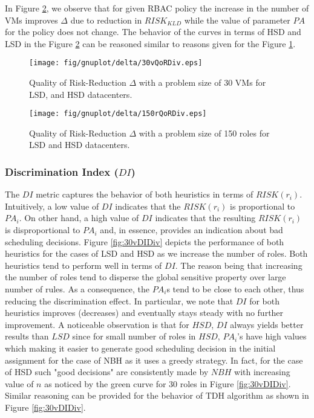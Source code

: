 In Figure \ref{fig:150rQoRDiv}, we observe that for given RBAC policy the increase in the number of VMs improves  $\Delta$ due to reduction in  $RISK_{KLD}$  while the value of parameter $PA$ for the policy does not change.   The behavior of the curves in terms of HSD and LSD in the Figure \ref{fig:150rQoRDiv} can be reasoned similar to reasons given for the Figure \ref{fig:30vQoRDiv}. 



 \begin{figure}[t!]
    \begin{center}
        \texttt{[image: fig/gnuplot/delta/30vQoRDiv.eps]}
        \caption{Quality of Risk-Reduction  $\Delta$ with a problem size of 30 VMs  for LSD, and HSD datacenters.} 
        \label{fig:30vQoRDiv}
        \vspace{-1.0em}
     \end{center}         
\end{figure} 

\begin{figure}[t!]
    \begin{center}
        \texttt{[image: fig/gnuplot/delta/150rQoRDiv.eps]}
        \caption{Quality of Risk-Reduction  $\Delta$ with a problem size of 150 roles  for LSD and HSD datacenters.} 
        \label{fig:150rQoRDiv}
        \vspace{-1.0em}
     \end{center}         
\end{figure} 

\subsubsection{Discrimination Index ($DI$)}
The $DI$ metric captures the behavior of both  heuristics  in terms of  $RISK(r_i)$. Intuitively, a low value of $DI$ indicates that the $RISK(r_i)$ is {\color{red}proportional} to $PA_i$.  On other hand, a high value of $DI$ indicates that the resulting $RISK(r_i)$ is {\color{red}disproportional} to $PA_i$ and, in essence, provides  an indication about  bad scheduling decisions.   Figure \ref{fig:30vDIDiv} depicts the performance of both heuristics for the cases of LSD and HSD as we increase the number of roles. Both heuristics tend to perform well in terms of $DI$. The reason being that increasing the number of roles tend to disperse the global sensitive property over large number of rules. As a consequence, the $PA_i$s tend to be close to each other, thus reducing the discrimination effect. In particular, we  note  that $DI$  for both heuristics improves (decreases) and eventually stays steady with no further improvement. A noticeable observation is that for $HSD$,  $DI$ always yields better results than $LSD$ since for small number of roles in $HSD$, $PA_i$'s have high values which making it  easier to generate  good scheduling decision in the initial assignment for the case of NBH as it uses a greedy strategy.  In fact,  for the case of HSD such "good decisions" are consistently made by $NBH$ with increasing value of $n$ as noticed by the green curve for 30 roles in Figure \ref{fig:30vDIDiv}. Similar reasoning can be provided for the behavior of TDH algorithm as shown in Figure \ref{fig:30vDIDiv}.

